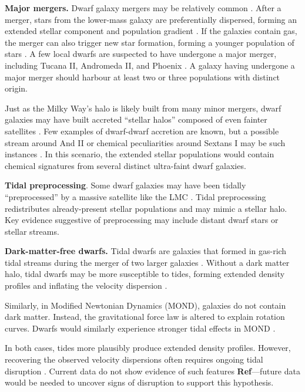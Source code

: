 \documentclass{aa}
\begin{document}
\textbf{Major mergers.} Dwarf galaxy mergers may be relatively common
\citep{deason+wetzel+garrison-kimmel2014}. After a merger, stars from
the lower-mass galaxy are preferentially dispersed, forming an extended
stellar component and population gradient
\citep{benitez-llambay+2016, deason+2022}. If the galaxies contain gas,
the merger can also trigger new star formation, forming a younger
population of stars \citep[e.g.,][]{genina+2019}. A few local dwarfs are
suspected to have undergone a major merger, including Tucana II,
Andromeda II, and Phoenix
\citep{lokas+2014, fouquet+2017, tarumi+yoshida+frebel2021, cardona-barrero+2021, querci+2025}.
A galaxy having undergone a major merger should harbour at least two or
three populations with distinct origin.

Just as the Milky Way's halo is likely built from many minor mergers,
dwarf galaxies may have built accreted ``stellar halos'' composed of
even fainter satellites \citep{ricotti+polisensky+cleland2022}. Few
examples of dwarf-dwarf accretion are known, but a possible stream
around And II or chemical peculiarities around Sextans I may be such
instances \citep{amorisco+evans+vandeven2014, roederer+2023}. In this
scenario, the extended stellar populations would contain chemical
signatures from several distinct ultra-faint dwarf galaxies.

\textbf{Tidal preprocessing}. Some dwarf galaxies may have been tidally
``preprocessed'' by a massive satellite like the LMC
\citep[e.g.,][]{santistevan+2023, riley+2024}. Tidal preprocessing
redistributes already-present stellar populations and may mimic a
stellar halo. Key evidence suggestive of preprocessing may include
distant dwarf stars or stellar streams.

\textbf{Dark-matter-free dwarfs.} Tidal dwarfs are galaxies that formed
in gas-rich tidal streams during the merger of two larger galaxies
\citep[e.g.,][]{mirabel+dottori+lutz1992, bournaud+duc2006}. Without a
dark matter halo, tidal dwarfs may be more susceptible to tides, forming
extended density profiles and inflating the velocity dispersion
\citep{casas+2012, yang+2014, wang+2024a}.

Similarly, in Modified Newtonian Dynamics (MOND), galaxies do not
contain dark matter. Instead, the gravitational force law is altered to
explain rotation curves. Dwarfs would similarly experience stronger
tidal effects in MOND \citep{mcgaugh+wolf2010, brada+milgrom2000}.

In both cases, tides more plausibly produce extended density profiles.
However, recovering the observed velocity dispersions often requires
ongoing tidal disruption
\citetext{\citealp{mcgaugh+wolf2010}; \citealp[but see
also][]{sanchez-salcedo+hernandez2007}}. Current data do not show
evidence of such features {\bf Ref}---future data would be needed to uncover
signs of disruption to support this hypothesis.
\end{document}
